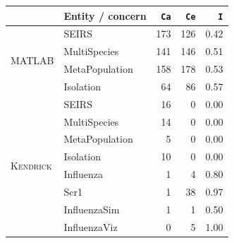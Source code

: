 \begin{tabular}{|l|l|r|r|r|}
\hline
& Entity / concern & \texttt{Ca} & \texttt{Ce} & \texttt{I} \\
\hline
\multirow{4}{*}{MATLAB} & SEIRS & 173 & 126 & 0.42 \\
 & MultiSpecies & 141 & 146 & 0.51 \\
 & MetaPopulation & 158 & 178 & 0.53 \\
 & Isolation & 64 & 86 & 0.57 \\
\hline
\multirow{8}{*}{\textsc{Kendrick}} & SEIRS & 16 & 0 & 0.00 \\
 & MultiSpecies & 14 & 0 & 0.00 \\
 & MetaPopulation & 5 & 0 & 0.00 \\
 & Isolation & 10 & 0 & 0.00 \\
 & Influenza & 1 & 4 & 0.80 \\
 & Scr1 & 1 & 38 & 0.97 \\
 & InfluenzaSim & 1 & 1 & 0.50 \\
 & InfluenzaViz & 0 & 5 & 1.00 \\
\hline
\end{tabular}
